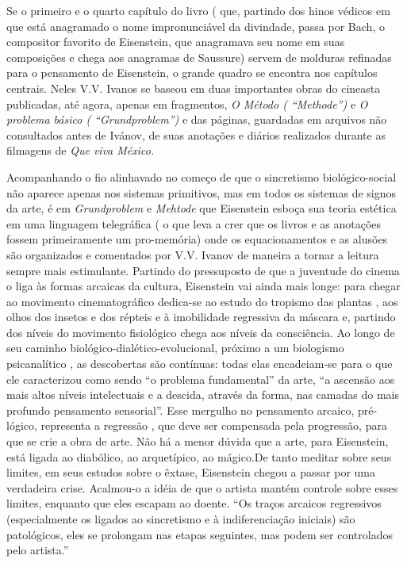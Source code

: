 Se o primeiro e o quarto capítulo do livro ( que, partindo dos hinos
védicos em que está anagramado o nome impronunciável da divindade, passa
por Bach, o compositor favorito de Eisenstein, que anagramava seu nome
em suas composições e chega aos anagramas de Saussure) servem de
molduras refinadas para o pensamento de Eisenstein, o grande quadro se
encontra nos capítulos centrais. Neles V.V. Ivanos se baseou em duas
importantes obras do cineasta publicadas, até agora, apenas em
fragmentos, \emph{O Método ( ``Methode'')} e \emph{O problema básico (
``Grundproblem'')} e das páginas, guardadas em arquivos não consultados
antes de Ivánov, de suas anotações e diários realizados durante as
filmagens de \emph{Que viva México.}

Acompanhando o fio alinhavado no começo de que o sincretismo
biológico-social não aparece apenas nos sistemas primitivos, mas em
todos os sistemas de signos da arte, é em \emph{Grundproblem} e
\emph{Mehtode} que Eisenstein esboça sua teoria estética em uma
linguagem telegráfica ( o que leva a crer que os livros e as anotações
fossem primeiramente um pro-memória) onde os equacionamentos e as
alusões são organizados e comentados por V.V. Ivanov de maneira a tornar
a leitura sempre mais estimulante. Partindo do pressuposto de que a
juventude do cinema o liga às formas arcaicas da cultura, Eisenstein vai
ainda mais longe: para chegar ao movimento cinematográfico dedica-se ao
estudo do tropismo das plantas , aos olhos dos insetos e dos répteis e à
imobilidade regressiva da máscara e, partindo dos níveis do movimento
fisiológico chega aos níveis da consciência. Ao longo de seu caminho
biológico-dialético-evolucional, próximo a um biologismo psicanalítico ,
as descobertas são contínuas: todas elas encadeiam-se para o que ele
caracterizou como sendo ``o problema fundamental'' da arte, ``a ascensão
aos mais altos níveis intelectuais e a descida, através da forma, nas
camadas do mais profundo pensamento sensorial''. Esse mergulho no
pensamento arcaico, pré-lógico, representa a regressão , que deve ser
compensada pela progressão, para que se crie a obra de arte. Não há a
menor dúvida que a arte, para Eisenstein, está ligada ao diabólico, ao
arquetípico, ao mágico.De tanto meditar sobre seus limites, em seus
estudos sobre o êxtase, Eisenstein chegou a passar por uma verdadeira
crise. Acalmou-o a idéia de que o artista mantém controle sobre esses
limites, enquanto que eles escapam ao doente. ``Os traços arcaicos
regressivos (especialmente os ligados ao sincretismo e à indiferenciação
iniciais) são patológicos, eles se prolongam nas etapas seguintes, mas
podem ser controlados pelo artista.''

